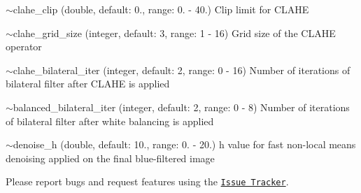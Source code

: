\begin{DoxyItemize}
\item {\ttfamily $\sim$clahe\+\_\+clip} (double, default\+: 0., range\+: 0. -\/ 40.) Clip limit for C\+L\+A\+HE
\item {\ttfamily $\sim$clahe\+\_\+grid\+\_\+size} (integer, default\+: 3, range\+: 1 -\/ 16) Grid size of the C\+L\+A\+HE operator
\item {\ttfamily $\sim$clahe\+\_\+bilateral\+\_\+iter} (integer, default\+: 2, range\+: 0 -\/ 16) Number of iterations of bilateral filter after C\+L\+A\+HE is applied
\item {\ttfamily $\sim$balanced\+\_\+bilateral\+\_\+iter} (integer, default\+: 2, range\+: 0 -\/ 8) Number of iterations of bilateral filter after white balancing is applied
\item {\ttfamily $\sim$denoise\+\_\+h} (double, default\+: 10., range\+: 0. -\/ 20.) h value for fast non-\/local means denoising applied on the final blue-\/filtered image
\end{DoxyItemize}

Please report bugs and request features using the \href{https://github.com/AUV-IITK/auv2018/issues}{\tt Issue Tracker}. 